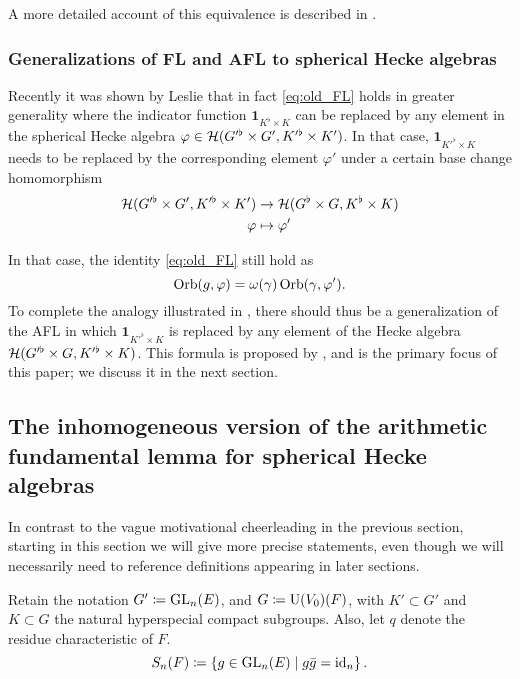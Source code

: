 A more detailed account of this equivalence is described in \cite[\S1.4]{ref:liuFJ}.

\subsubsection{Generalizations of FL and AFL to spherical Hecke algebras}
Recently it was shown by Leslie \cite{ref:leslie} that in fact
\eqref{eq:old_FL} holds in greater generality where the indicator function
$\mathbf{1}_{K^\flat \times K}$ can be replaced by any element in the spherical
Hecke algebra $\varphi \in \mathcal H(G'^\flat \times G', K'^\flat \times K')$.
In that case, $\mathbf{1}_{K'^\flat \times K}$ needs to be replaced
by the corresponding element $\varphi'$ under a certain base change homomorphism
\begin{align*}
  \mathcal H(G'^\flat \times G', K'^\flat \times K') &\to \mathcal H(G^\flat \times G, K^\flat \times K) \\
  \varphi &\mapsto \varphi'
\end{align*}

In that case, the identity \eqref{eq:old_FL} still hold as
\begin{equation}
  \operatorname{Orb}(g, \varphi) = \omega(\gamma) \operatorname{Orb}(\gamma, \varphi').
  \label{eq:eq:leslie_FL}
\end{equation}
To complete the analogy illustrated in ,
there should thus be a generalization of the AFL in which
$\mathbf{1}_{K'^\flat \times K}$ is replaced by any element of the Hecke algebra
$\mathcal H(G'^\flat \times G, K'^\flat \times K)$.
This formula is proposed by \cite{ref:AFLspherical},
and is the primary focus of this paper; we discuss it in the next section.

\subsection{The inhomogeneous version of the arithmetic fundamental lemma for spherical Hecke algebras}
In contrast to the vague motivational cheerleading in the previous section,
starting in this section we will give more precise statements,
even though we will necessarily need to reference definitions appearing in later sections.

Retain the notation $G' \coloneqq \operatorname{GL}_n(E)$, and $G \coloneqq \operatorname{U}(V_0)(F)$,
with $K' \subset G'$ and $K \subset G$ the natural hyperspecial compact subgroups.
Also, let $q$ denote the residue characteristic of $F$.
\[ S_n(F) \coloneqq \left\{ g \in \operatorname{GL}_n(E) \mid g \bar{g} = \operatorname{id}_n \right\}. \]

